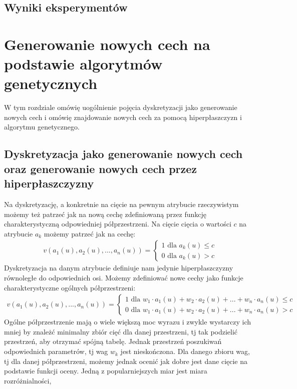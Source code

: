 \documentclass[magisterska]{pracamgr}
\theoremstyle{plain}
\theoremstyle{definition}
\theoremstyle{remark}
\begin{document}
\section{Wyniki eksperymentów}


\chapter{Generowanie nowych cech na podstawie algorytmów genetycznych}

W tym rozdziale omówię uogólnienie pojęcia dyskretyzacji jako generowanie nowych cech i omówię
znajdowanie nowych cech za pomocą hiperpłaszczyzn i algorytmu genetycznego.

\section{Dyskretyzacja jako generowanie nowych cech oraz generowanie nowych cech przez hiperpłaszczyzny}
Na dyskretyzację, a konkretnie na cięcie na pewnym atrybucie rzeczywistym możemy też patrzeć
jak na nową cechę zdefiniowaną przez funkcję charakterystyczną odpowiedniej półprzestrzeni. Na cięcie cięcia o wartości
$c$ na atrybucie $a_k$ możemy patrzeć jak na cechę:
\begin{align*}
v(a_1(u), a_2(u), ..., a_n(u)) = \begin{cases} 1 \text{ dla } a_k(u) \leq c \\ 0 \text{ dla } a_k(u) > c \end{cases}
\end{align*}
Dyskretyzacja na danym atrybucie definiuje nam jedynie hiperpłaszczyzny równoległe do odpowiednich osi. 
Możemy zdefiniować nowe cechy jako funkcje charakterystyczne ogólnych półprzestrzeni:
\begin{align*}
v(a_1(u), a_2(u), ..., a_n(u)) = \begin{cases} 1 \text{ dla } w_1 \cdot a_1(u) + w_2 \cdot a_2(u) + ... + w_n \cdot a_n(u) \leq c 
\\ 0 \text{ dla } w_1 \cdot a_1(u) + w_2 \cdot a_2(u) + ... + w_n \cdot a_n(u) > c \end{cases}
\end{align*}
Ogólne półprzestrzenie mają o wiele większą moc wyrazu i zwykle wystarczy ich mniej by znależć minimalny zbiór cięć dla
danej przestrzeni, tj tak podzielić przestrzeń, aby otrzymać spójną tabelę.
Jednak przestrzeń poszukiwań odpowiednich parametrów, tj wag $w_k$ jest nieskończona. Dla danego zbioru wag, tj dla danej półprzestrzeni,
możemy jednak ocenić jak dobre jest dane cięcie na podstawie funkcji oceny. Jedną z popularniejszych miar jest miara rozróżnialności, 
\end{document}
